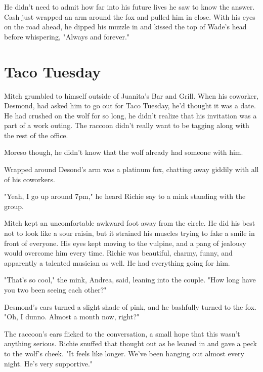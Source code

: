 He didn't need to admit how far into his future lives he saw to know the answer. Cash just wrapped an arm around the fox and pulled him in close. With his eyes on the road ahead, he dipped his muzzle in and kissed the top of Wade's head before whispering, "Always and forever."

\cleartoverso


\chapter*{Taco Tuesday}


Mitch grumbled to himself outside of Juanita's Bar and Grill. When his coworker, Desmond, had asked him to go out for Taco Tuesday, he'd thought it was a date. He had crushed on the wolf for so long, he didn't realize that his invitation was a part of a work outing. The raccoon didn't really want to be tagging along with the rest of the office.

Moreso though, he didn't know that the wolf already had someone with him.

Wrapped around Desond's arm was a platinum fox, chatting away giddily with all of his coworkers.

"Yeah, I go up around 7pm," he heard Richie say to a mink standing with the group.

Mitch kept an uncomfortable awkward foot away from the circle. He did his best not to look like a sour raisin, but it strained his muscles trying to fake a smile in front of everyone. His eyes kept moving to the vulpine, and a pang of jealousy would overcome him every time. Richie was beautiful, charmy, funny, and apparently a talented musician as well. He had everything going for him.

"That's so cool," the mink, Andrea, said, leaning into the couple. "How long have you two been seeing each other?"

Desmond's ears turned a slight shade of pink, and he bashfully turned to the fox. "Oh, I dunno. Almost a month now, right?"

The raccoon's ears flicked to the conversation, a small hope that this wasn't anything serious. Richie snuffed that thought out as he leaned in and gave a peck to the wolf's cheek. "It feels like longer. We've been hanging out almost every night. He's very supportive."

